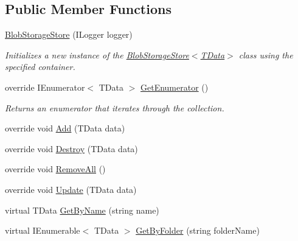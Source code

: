 \subsection*{Public Member Functions}
\begin{DoxyCompactItemize}
\item 
\hyperlink{classCqrs_1_1Azure_1_1BlobStorage_1_1BlobStorageStore_ae1979c63b97dea8e207dda7b0087ee6b_ae1979c63b97dea8e207dda7b0087ee6b}{Blob\+Storage\+Store} (I\+Logger logger)
\begin{DoxyCompactList}\small\item\em Initializes a new instance of the \hyperlink{classCqrs_1_1Azure_1_1BlobStorage_1_1BlobStorageStore_ae1979c63b97dea8e207dda7b0087ee6b_ae1979c63b97dea8e207dda7b0087ee6b}{Blob\+Storage\+Store$<$\+T\+Data$>$} class using the specified container. \end{DoxyCompactList}\item 
override I\+Enumerator$<$ T\+Data $>$ \hyperlink{classCqrs_1_1Azure_1_1BlobStorage_1_1BlobStorageStore_a7b106644bd8bfe5b1b5e5ef7bc279769_a7b106644bd8bfe5b1b5e5ef7bc279769}{Get\+Enumerator} ()
\begin{DoxyCompactList}\small\item\em Returns an enumerator that iterates through the collection. \end{DoxyCompactList}\item 
override void \hyperlink{classCqrs_1_1Azure_1_1BlobStorage_1_1BlobStorageStore_a527ef0e0d39f9e01f4112b6bc90129b2_a527ef0e0d39f9e01f4112b6bc90129b2}{Add} (T\+Data data)
\item 
override void \hyperlink{classCqrs_1_1Azure_1_1BlobStorage_1_1BlobStorageStore_a7e4870567b393327563d131cb25151e0_a7e4870567b393327563d131cb25151e0}{Destroy} (T\+Data data)
\item 
override void \hyperlink{classCqrs_1_1Azure_1_1BlobStorage_1_1BlobStorageStore_a4371b95250e51b8462d8ab33b6f3fe9e_a4371b95250e51b8462d8ab33b6f3fe9e}{Remove\+All} ()
\item 
override void \hyperlink{classCqrs_1_1Azure_1_1BlobStorage_1_1BlobStorageStore_a03be976aded454866b4589de99a9e1c8_a03be976aded454866b4589de99a9e1c8}{Update} (T\+Data data)
\item 
virtual T\+Data \hyperlink{classCqrs_1_1Azure_1_1BlobStorage_1_1BlobStorageStore_a16464b2b12056d0d270b8657b6c9e1e6_a16464b2b12056d0d270b8657b6c9e1e6}{Get\+By\+Name} (string name)
\item 
virtual I\+Enumerable$<$ T\+Data $>$ \hyperlink{classCqrs_1_1Azure_1_1BlobStorage_1_1BlobStorageStore_a96064e01ccf12413582acd7497f3802d_a96064e01ccf12413582acd7497f3802d}{Get\+By\+Folder} (string folder\+Name)
\end{DoxyCompactItemize}
